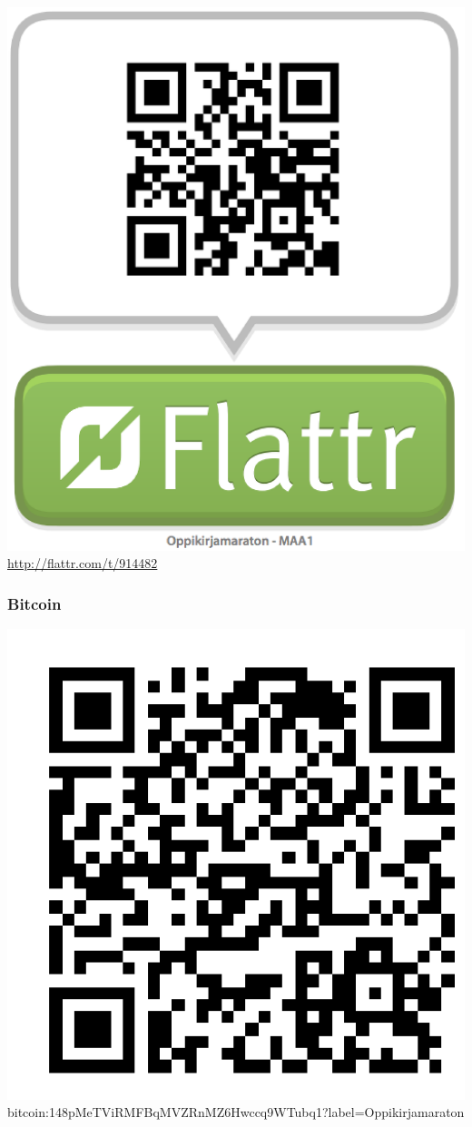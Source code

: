 \includegraphics[scale=0.2]{MAA1-Flattr.png} \\
\url{http://flattr.com/t/914482}

\subsubsection*{Bitcoin}

\includegraphics[scale=0.2]{Bitcoin.png} \\
bitcoin:148pMeTViRMFBqMVZRnMZ6Hwccq9WTubq1?label=Oppikirjamaraton

